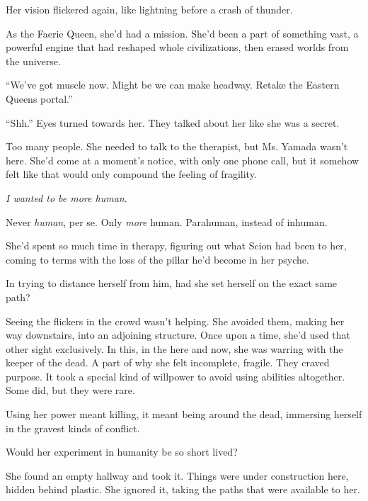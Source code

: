 Her vision flickered again, like lightning before a crash of thunder.



As the Faerie Queen, she'd had a mission.  She'd been a part of something vast, a powerful engine that had reshaped whole civilizations, then erased worlds from the universe.



``We've got muscle now.  Might be we can make headway.  Retake the Eastern Queens portal.''



``Shh.''  Eyes turned towards her.  They talked about her like she was a secret.



Too many people.  She needed to talk to the therapist, but Ms. Yamada wasn't here.  She'd come at a moment's notice, with only one phone call, but it somehow felt like that would only compound the feeling of fragility.



\emph{I wanted to be more human}.



Never \emph{human}, per se.  Only \emph{more} human.  Parahuman, instead of inhuman.



She'd spent so much time in therapy, figuring out what Scion had been to her, coming to terms with the loss of the pillar he'd become in her psyche.



In trying to distance herself from him, had she set herself on the exact same path?



Seeing the flickers in the crowd wasn't helping.  She avoided them, making her way downstairs, into an adjoining structure.  Once upon a time, she'd used that other sight exclusively.  In this, in the here and now, she was warring with the keeper of the dead.  A part of why she felt incomplete, fragile.  They craved purpose.  It took a special kind of willpower to avoid using abilities altogether.  Some did, but they were rare.



Using her power meant killing, it meant being around the dead, immersing herself in the gravest kinds of conflict.



Would her experiment in humanity be so short lived?



She found an empty hallway and took it.  Things were under construction here, hidden behind plastic.  She ignored it, taking the paths that were available to her.



